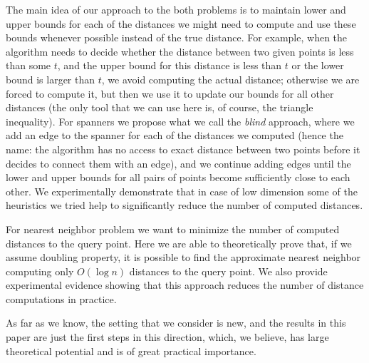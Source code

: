 \documentclass[a4paper,USenglish]{socg-lipics-v2018}
\begin{document}


The main idea of our approach to the both problems is to maintain
lower and upper bounds
for each of the distances we might need to compute
and use these bounds whenever possible instead
of the true distance. For example, when the algorithm
needs to decide whether the distance between two given points
is less than some $t$, and the upper bound for this distance is
less than $t$ or the lower bound is larger than $t$,
we avoid computing the actual distance;
otherwise we are forced to compute it, but then
we use it to update our bounds for all other distances (the
only tool that we can use here is, of course, the triangle inequality).
For spanners we propose what we call the \textit{blind} approach,
where we add an edge to the spanner for each of the distances we computed 
(hence the name: the
algorithm has no access to exact distance between two points before it decides to connect them
with an edge), and we continue adding edges until the lower and upper bounds
for all pairs of points become sufficiently close to each other.
We experimentally demonstrate that in case of low dimension
some of the heuristics we tried help to significantly reduce the number of
computed distances.


For nearest neighbor problem we want to minimize the number
of computed distances to the query point. Here we are able to theoretically prove that, 
if we assume doubling property,
it is possible to find the approximate nearest neighbor computing
only $O(\log n)$ distances to the query point.
We also provide experimental evidence showing that this approach
reduces the number of distance computations in practice.


As far as we know, the setting that we consider is new, and the results in this paper
are just the first steps in this direction, which, we believe, has large
theoretical potential and is of great practical importance.
\end{document}
